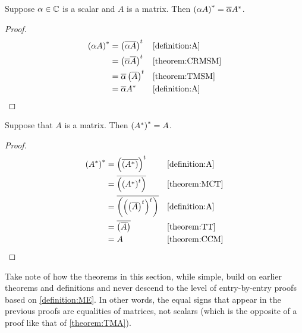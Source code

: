 \documentclass{ximera}
\begin{document}
\begin{theorem}
\label{theorem:AMSM}

Suppose $\alpha\in\mathbb{C}$ is a scalar and $A$ is a matrix.  Then $\left(\alpha A\right)^\ast=\overline{\alpha}A^\ast$.

\begin{proof}

  \begin{align*}
    \left(\alpha A\right)^\ast
    &=\left(\overline{\alpha A}\right)^{t}
    &&\ref{definition:A}\\
    &=\left(\overline{\alpha}\overline{A}\right)^{t}
    &&\ref{theorem:CRMSM}\\
    &=\overline{\alpha}\left(\overline{A}\right)^{t}
    &&\ref{theorem:TMSM}\\
    &=\overline{\alpha}A^\ast
    &&\ref{definition:A}
\end{align*}

\end{proof}
\end{theorem}

\begin{theorem}
\label{theorem:AA}

Suppose that $A$ is a matrix.  Then $\left(A^\ast\right)^\ast=A$.

\begin{proof}
  
  \begin{align*}
    \left(A^\ast\right)^\ast
    &=\left(\overline{\left(A^\ast\right)}\right)^{t}
    &&\ref{definition:A}\\
    &=\overline{\left(\left(A^\ast\right)^{t}\right)}
    &&\ref{theorem:MCT}\\
    &=\overline{\left(\left(\left(\overline{A}\right)^{t}\right)^{t}\right)}
    &&\ref{definition:A}\\
    &=\overline{\left(\overline{A}\right)}
    &&\ref{theorem:TT}\\
    &=A
    &&\ref{theorem:CCM}
  \end{align*}
\end{proof}
\end{theorem}

Take note of how the theorems in this section, while simple, build on
earlier theorems and definitions and never descend to the level of
entry-by-entry proofs based on \ref{definition:ME}.  In other words,
the equal signs that appear in the previous proofs are equalities of
matrices, not scalars (which is the opposite of a proof like that of
\ref{theorem:TMA}).
\end{document}
